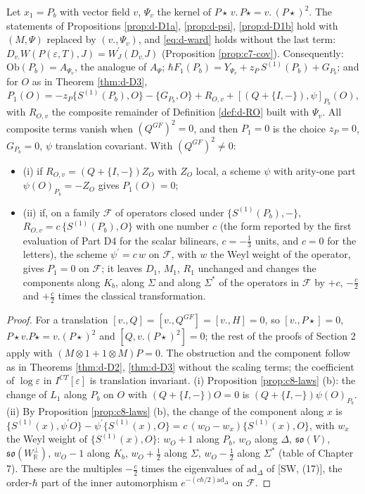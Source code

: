 \begin{proposition}
\label{prop:d-P}
Let $x_1=P_b$ with vector field $v$, $\Psi_v$ the kernel of $P\star\,v.\,P\star=v.\,(P\star)^2$. The statements of Propositions \ref{prop:d-D1a}, \ref{prop:d-psi}, \ref{prop:d-D1b} hold with $(M,\Psi)$ replaced by $(v.,\Psi_v)$, and \eqref{eq:d-ward} holds without the last term: $D_{v.}W(P(\varepsilon,T),J)=W^{\prime}_J(D_{v.}J)$ (Proposition \ref{prop:c7-cov}). Consequently: $\mathrm{Ob}(P_b)=A_{\Psi_v}$, the analogue of $A_\Psi$; $\hbar F_1(P_b)=Y_{\Psi_v}+z_P\,S^{(1)}(P_b)+G_{P_b}$; and for $O$ as in Theorem \ref{thm:d-D3},
\[
P_1(O)=-z_P\{S^{(1)}(P_b),O\}-\{G_{P_b},O\}+R_{O,v}+[(Q+\{I,-\}),\psi]_{P_b}(O),
\]
with $R_{O,v}$ the composite remainder of Definition \ref{def:d-RO} built with $\Psi_v$. All composite terms vanish when $(Q^{GF})^2=0$, and then $P_1=0$ is the choice $z_P=0$, $G_{P_b}=0$, $\psi$ translation covariant. With $(Q^{GF})^2\neq0$:
\begin{itemize}
\item (i) if $R_{O,v}=(Q+\{I,-\})Z_O$ with $Z_O$ local, a scheme $\psi$ with arity-one part $\psi(O)_{P_b}=-Z_O$ gives $P_1(O)=0$;
\item (ii) if, on a family $\mathcal F$ of operators closed under $\{S^{(1)}(P_b),-\}$, $R_{O,v}=c\,\{S^{(1)}(P_b),O\}$ with one number $c$ (the form reported by the first evaluation of Part D4 for the scalar bilinears, $c=-\tfrac13$ units, and $c=0$ for the letters), the scheme $\psi^{\prime}=c\,w$ on $\mathcal F$, with $w$ the Weyl weight of the operator, gives $P_1=0$ on $\mathcal F$; it leaves $D_1$, $M_1$, $R_1$ unchanged and changes the components along $K_b$, along $\Sigma$ and along $\Sigma^*$ of the operators in $\mathcal F$ by $+c$, $-\tfrac c2$ and $+\tfrac c2$ times the classical transformation.
\end{itemize}
\end{proposition}

\begin{proof}
For a translation $[v.,Q]=[v.,Q^{GF}]=[v.,H]=0$, so $[v.,P\star]=0$, $P\star v.P\star=v.(P\star)^2$ and $[Q,v.(P\star)^2]=0$; the rest of the proofs of Section 2 apply with $(M\otimes1+1\otimes M)P=0$. The obstruction and the component follow as in Theorems \ref{thm:d-D2}, \ref{thm:d-D3} without the scaling terms; the coefficient of $\log\varepsilon$ in $I^{CT}[\varepsilon]$ is translation invariant. (i) Proposition \ref{prop:c8-laws} (b): the change of $L_1$ along $P_b$ on $O$ with $(Q+\{I,-\})O=0$ is $(Q+\{I,-\})\psi(O)_{P_b}$. (ii) By Proposition \ref{prop:c8-laws} (b), the change of the component along $x$ is $\{S^{(1)}(x),\psi^{\prime}O\}-\psi^{\prime}\{S^{(1)}(x),O\}=c\,(w_O-w_{x})\{S^{(1)}(x),O\}$, with $w_x$ the Weyl weight of $\{S^{(1)}(x),O\}$: $w_O+1$ along $P_b$, $w_O$ along $\Delta$, $\mathfrak{so}(V)$, $\mathfrak{so}(W_{\mathbb R}^\perp)$, $w_O-1$ along $K_b$, $w_O+\tfrac12$ along $\Sigma$, $w_O-\tfrac12$ along $\Sigma^*$ (table of Chapter 7). These are the multiples $-\tfrac c2$ times the eigenvalues of $\mathrm{ad}_\Delta$ of [SW, (17)], the order-$\hbar$ part of the inner automorphism $e^{-(c\hbar/2)\mathrm{ad}_\Delta}$ on $\mathcal F$.
\end{proof}

